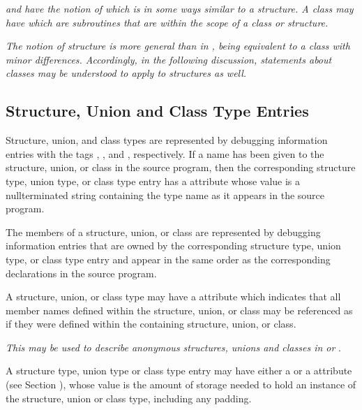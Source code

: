 \textit{ and 
 have the notion of  which is in some
ways similar to a structure. A class may have  which are subroutines that are within the scope
of a class or structure.}

\textit{The  notion of 
structure is more general than in , being
equivalent to a class with minor differences. Accordingly,
in the following discussion, statements about 
 classes may
be understood to apply to  structures as well.}

\subsection{Structure, Union and Class Type Entries}
\label{chap:structureunionandclasstypeentries}
Structure, union, and class types are represented by debugging
information entries 
with 
the tags 
\DWTAGstructuretypeTARG,
\DWTAGuniontypeTARG, 
and \DWTAGclasstypeTARG,
respectively. If a name has been given to the structure,
union, or class in the source program, then the corresponding
structure type, union type, or class type entry has a
\DWATname{} attribute 
whose value is a null\dash terminated string
containing the type name as it appears in the source program.

The members of a structure, union, or class are represented
by debugging information entries that are owned by the
corresponding structure type, union type, or class type entry
and appear in the same order as the corresponding declarations
in the source program.

A structure, union, or class type may have a \DWATexportsymbolsDEFN{}
attribute 
which indicates that all member names defined within 
the structure, union, or class may be referenced as if they were
defined within the containing structure, union, or class. 

\textit{This may be used to describe anonymous structures, unions 
and classes in  or }.

A structure type, union type or class type entry may have
either a \DWATbytesize{} or a
\DWATbitsize{} attribute 
\hypertarget{chap:DWATbitsizedatamemberbitsize}{}
(see Section ), 
whose value is the amount of storage needed
to hold an instance of the structure, union or class type,
including any padding.
  
